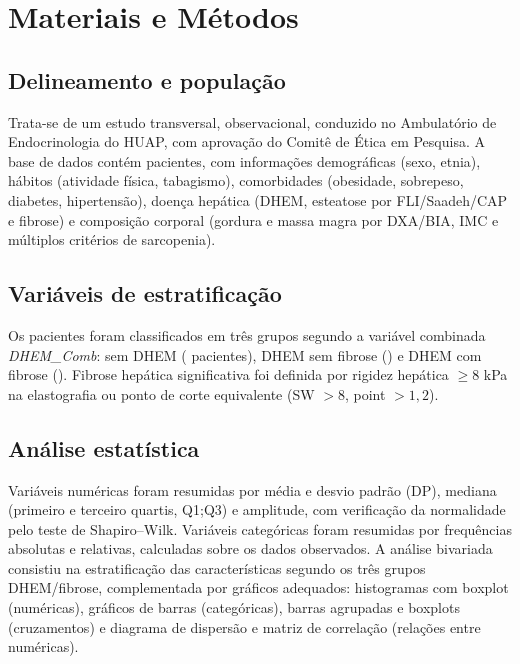 \documentclass[11pt,a4paper]{article}
\begin{document}
\section{Materiais e Métodos}
\label{sec:metodos}

\subsection{Delineamento e população}

Trata-se de um estudo transversal, observacional, conduzido no Ambulatório de
Endocrinologia do HUAP, com aprovação do Comitê de Ética em Pesquisa. A base de
dados contém \NTotal{} pacientes, com informações demográficas (sexo, etnia),
hábitos (atividade física, tabagismo), comorbidades (obesidade, sobrepeso,
diabetes, hipertensão), doença hepática (DHEM, esteatose por FLI/Saadeh/CAP e
fibrose) e composição corporal (gordura e massa magra por DXA/BIA, IMC e
múltiplos critérios de sarcopenia).

\subsection{Variáveis de estratificação}

Os pacientes foram classificados em três grupos segundo a variável combinada
\textit{DHEM\_Comb}: sem DHEM (\NSemDHEM{} pacientes), DHEM sem fibrose
(\NDHEMSemFibrose{}) e DHEM com fibrose (\NDHEMComFibrose{}). Fibrose hepática
significativa foi definida por rigidez hepática $\geq 8$ kPa na elastografia ou
ponto de corte equivalente (SW $> 8$, point $> 1{,}2$).

\subsection{Análise estatística}

Variáveis numéricas foram resumidas por média e desvio padrão (DP), mediana
(primeiro e terceiro quartis, Q1;Q3) e amplitude, com verificação da
normalidade pelo
teste de Shapiro--Wilk. Variáveis categóricas foram resumidas por frequências
absolutas e relativas, calculadas sobre os dados observados. A análise bivariada
consistiu na estratificação das características segundo os três grupos
DHEM/fibrose, complementada por gráficos adequados: histogramas com boxplot
(numéricas), gráficos de barras (categóricas), barras agrupadas e boxplots
(cruzamentos) e diagrama de dispersão e matriz de correlação (relações entre
numéricas).
\end{document}

